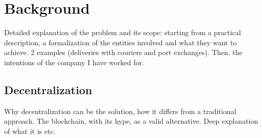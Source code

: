 \chapter{Background}
\label{cha:background}
Detailed explanation of the problem and its scope: starting from a practical description, a formalization of the entities involved and what they want to achieve. 2 examples (deliveries with couriers and port exchanges). Then, the intentions of the company I have worked for.

\section{Decentralization}
\label{sec:decentralization}
Why decentralization can be the solution, how it differs from a traditional approach. The blockchain, with its hype, as a valid alternative. Deep explanation of what it is etc.

